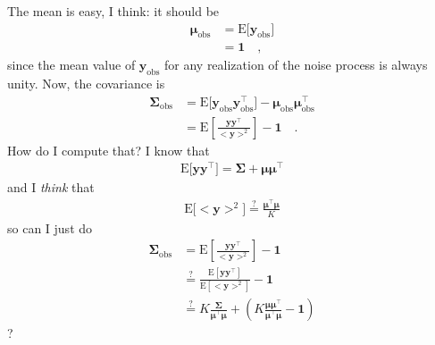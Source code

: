 \documentclass[modern]{aastex62}
\begin{document}
The mean is easy, I think: it should be
%
\begin{align}
    \pmb{\mu}_{\mathrm{obs}}
     & =
    \mathrm{E}\big[ \mathbf{y}_{\mathrm{obs}} \big]
    \nonumber \\[0.5em]
     & =
    \mathbf{1}
    \quad,
\end{align}
%
since the mean value of $\mathbf{y}_{\mathrm{obs}}$ for any realization
of the noise process is always unity. Now, the covariance is
%
\begin{align}
    \pmb{\Sigma}_{\mathrm{obs}}
     & =
    \mathrm{E}\big[ \mathbf{y}_{\mathrm{obs}} \mathbf{y}_{\mathrm{obs}}^\top \big]
    - \pmb{\mu}_{\mathrm{obs}} \pmb{\mu}_{\mathrm{obs}}^\top
    \nonumber \\[0.5em]
     & =
    \mathrm{E}\left[ \frac{\mathbf{y}\mathbf{y}^\top}{\big<\mathbf{y}\big>^2} \right]
    - \mathbf{1}
    \quad.
\end{align}
%
How do I compute that? I know that
%
\begin{align}
    \mathrm{E}\big[ \mathbf{y} \mathbf{y}^\top \big] = \pmb{\Sigma} + \pmb{\mu}\pmb{\mu}^\top
\end{align}
%
and I \emph{think} that
%
\begin{align}
    \mathrm{E}\big[ \big<\mathbf{y}\big>^2 \big] \stackrel{?}{=} \frac{\pmb{\mu}^\top\pmb{\mu}}{K}
\end{align}
%
so can I just do
%
\begin{align}
    \pmb{\Sigma}_{\mathrm{obs}}
     & =
    \mathrm{E}\left[ \frac{\mathbf{y}\mathbf{y}^\top}{\big<\mathbf{y}\big>^2} \right]
    - \mathbf{1}
    \nonumber          \\[0.5em]
     & \stackrel{?}{=}
    \frac{ \mathrm{E}\left[\mathbf{y}\mathbf{y}^\top \right]}
    { \mathrm{E}\left[\big<\mathbf{y}\big>^2 \right]}
    - \mathbf{1}
    \nonumber          \\[0.5em]
     & \stackrel{?}{=}
    K
    \frac{ \pmb{\Sigma} }
    { \pmb{\mu}^\top\pmb{\mu} }
    +
    \left(K\frac{ \pmb{\mu}\pmb{\mu}^\top }{\pmb{\mu}^\top\pmb{\mu}}
    - \mathbf{1}
    \right)
\end{align}
?
\end{document}
